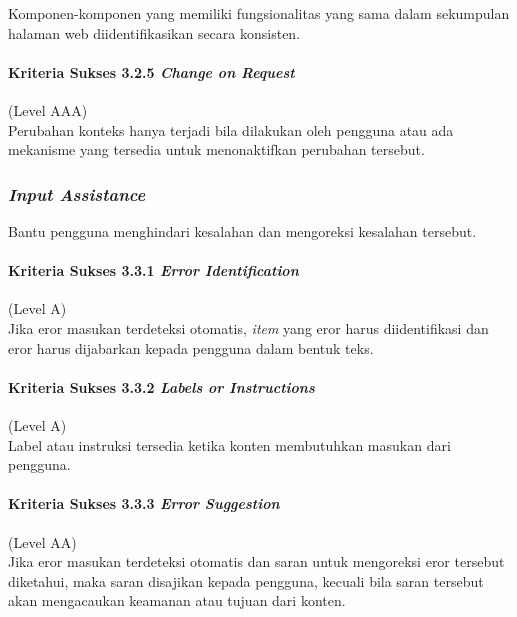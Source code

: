 Komponen-komponen yang memiliki fungsionalitas yang sama dalam sekumpulan halaman web diidentifikasikan secara konsisten.

\paragraph{Kriteria Sukses 3.2.5 \textit{Change on Request}}
\label{sec:kriteria_sukses_3.2.5}
(Level AAA)\\

Perubahan konteks hanya terjadi bila dilakukan oleh pengguna atau ada mekanisme yang tersedia untuk menonaktifkan perubahan tersebut.

\subsubsection{\textit{Input Assistance}}
\label{sec:input_assistance}
Bantu pengguna menghindari kesalahan dan mengoreksi kesalahan tersebut.

\paragraph{Kriteria Sukses 3.3.1 \textit{Error Identification}}
\label{sec:kriteria_sukses_3.3.1}
(Level A)\\

Jika eror masukan terdeteksi otomatis, \textit{item} yang eror harus diidentifikasi dan eror harus dijabarkan kepada pengguna dalam bentuk teks.

\paragraph{Kriteria Sukses 3.3.2 \textit{Labels or Instructions}}
\label{sec:kriteria_sukses_3.3.2}
(Level A)\\

Label atau instruksi tersedia ketika konten membutuhkan masukan dari pengguna.

\paragraph{Kriteria Sukses 3.3.3 \textit{Error Suggestion}}
\label{sec:kriteria_sukses_3.3.3}
(Level AA)\\

Jika eror masukan terdeteksi otomatis dan saran untuk mengoreksi eror tersebut diketahui, maka saran disajikan kepada pengguna, kecuali bila saran tersebut akan mengacaukan keamanan atau tujuan dari konten.

